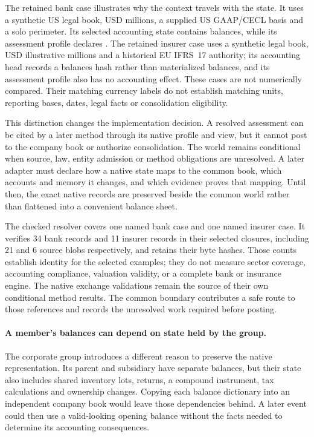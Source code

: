 The retained bank case illustrates why the context travels with the state. It
uses a synthetic US legal book, USD millions, a supplied US GAAP/CECL basis and
a solo perimeter. Its selected accounting state contains balances, while its
assessment profile declares . The retained insurer
case uses a synthetic legal book, USD illustrative millions and a historical
EU IFRS~17 authority; its accounting head records a balances hash rather than
materialized balances, and its assessment profile also has no accounting
effect. These cases are not numerically compared. Their matching currency
labels do not establish matching units, reporting bases, dates, legal facts or
consolidation eligibility.

This distinction changes the implementation decision. A resolved assessment
can be cited by a later method through its native profile and view, but it
cannot post to the company book or authorize consolidation. The world remains
conditional when source, law, entity admission or method obligations are
unresolved. A later adapter must declare how a native state maps to the common
book, which accounts and memory it changes, and which evidence proves that
mapping. Until then, the exact native records are preserved beside the common
world rather than flattened into a convenient balance sheet.

The checked resolver covers one named bank case and one named insurer case.
It verifies 34 bank records and 11 insurer records in their selected closures,
including 21 and 6 source blobs respectively, and retains their byte hashes.
Those counts establish identity for the selected examples; they do not measure
sector coverage, accounting compliance, valuation validity, or a complete bank
or insurance engine. The native exchange validations remain the source of their
own conditional method results. The common boundary contributes a safe route
to those references and records the unresolved work required before posting.



\paragraph{A member's balances can depend on state held by the group.}
The corporate group introduces a different reason to preserve the native
representation. Its parent and subsidiary have separate balances, but their
state also includes shared inventory lots, returns, a compound instrument,
tax calculations and ownership changes. Copying each balance dictionary into
an independent company book would leave those dependencies behind. A later
event could then use a valid-looking opening balance without the facts needed
to determine its accounting consequences.

